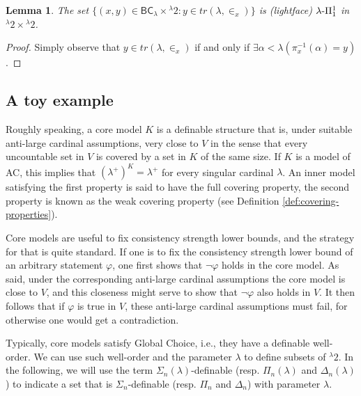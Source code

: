 \documentclass{amsart}
\numberwithin{equation}{section}
\def\hyp{{\hbox{-}}}
\newtheorem{lemma}[theorem]{Lemma}
\theoremstyle{definition}
\theoremstyle{remark}
\begin{document}
\begin{lemma}\label{lemma:y-in-transitive-closure-of-lambda-inx-is-pi11}
    The set $\{(x,y)\in \mathsf{BC}_{\lambda}\times{}^{\lambda}2:y\in tr(\lambda,\in_x)\}$ is \emph{(lightface)} $\lambda\hyp\Pi^1_1$ in ${}^{\lambda}2\times{}^{\lambda}2$.
\end{lemma}
\begin{proof}
    Simply observe that $y\in tr(\lambda,\in_x)$ if and only if $\exists\alpha<\lambda(\pi^{-1}_{x}(\alpha)=y)$. 
\end{proof}


\subsection{A toy example}

Roughly speaking, a core model $K$ is a definable structure that is, under suitable anti-large cardinal assumptions, very close to $V$ in the sense that every uncountable set in $V$ is covered by a set in $K$ of the same size. If $K$ is a model of \textsf{AC}, this implies that $(\lambda^{+})^{K}=\lambda^{+}$ for every singular cardinal $\lambda$. An inner model satisfying the first property is said to have the full covering property, the second property is known as the weak covering property (see Definition \ref{def:covering-properties}). 

Core models are useful to fix consistency strength lower bounds, and the strategy for that is quite standard. If one is to fix the consistency strength lower bound of an arbitrary statement $\varphi$, one first shows that $\neg\varphi$ holds in the core model. As said, under the corresponding anti-large cardinal assumptions the core model is close to $V$, and this closeness might serve to show that $\neg\varphi$ also holds in $V$. It then follows that if $\varphi$ is true in $V$, these anti-large cardinal assumptions must fail, for otherwise one would get a contradiction. 

Typically, core models satisfy Global Choice, i.e., they have a definable well-order. We can use such well-order and the parameter $\lambda$ to define subsets of ${}^\lambda 2$. In the following, we will use the term $\Sigma_n(\lambda)$-definable (resp. $\Pi_n(\lambda)$ and $\Delta_n(\lambda)$) to indicate a set that is $\Sigma_n$-definable (resp. $\Pi_n$ and $\Delta_n$) with parameter $\lambda$.
\end{document}
